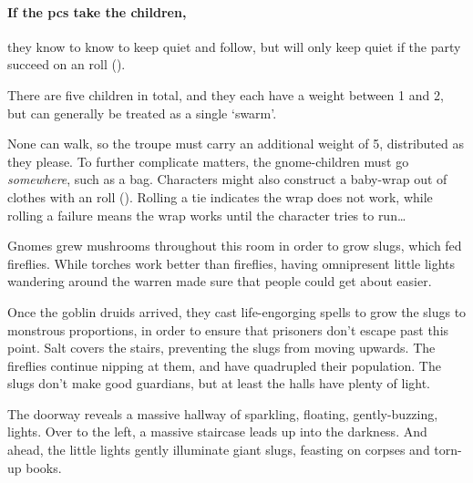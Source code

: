 \begin{multicols}{2}
\paragraph{If the \glspl{pc} take the children,}
they know to know to keep quiet and follow, but will only keep quiet if the party succeed on an  roll (\tn[10]).


There are five children in total, and they each have a \gls{weight} between 1 and 2, but can generally be treated as a single `swarm'.%

None can walk, so the troupe must carry an additional \gls{weight} of 5, distributed as they please.
To further complicate matters, the gnome-children must go \emph{somewhere}, such as a bag.
Characters might also construct a baby-wrap out of clothes with an  roll (\tn[10]).
Rolling a tie indicates the wrap does not work, while rolling a failure means the wrap works until the character tries to run\ldots


\begin{exampletext}
Gnomes grew mushrooms throughout this room in order to grow slugs, which fed fireflies.
While torches work better than fireflies, having omnipresent little lights wandering around the \gls{warren} made sure that people could get about easier.

Once the goblin druids arrived, they cast life-engorging spells to grow the slugs to monstrous proportions, in order to ensure that prisoners don't escape past this point.
Salt covers the stairs, preventing the slugs from moving upwards.
The fireflies continue nipping at them, and have quadrupled their population.
The slugs don't make good guardians, but at least the halls have plenty of light.
\end{exampletext}


\begin{boxtext}
  The doorway reveals a massive hallway of sparkling, floating, gently-buzzing, lights.
  Over to the left, a massive staircase leads up into the darkness.
  And ahead, the little lights gently illuminate giant slugs, feasting on corpses and torn-up books.


\end{boxtext}
\end{multicols}
